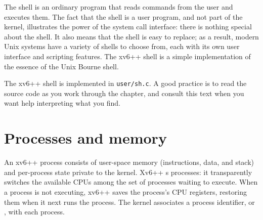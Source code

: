 The shell is an ordinary program that reads commands from the user
and executes them.
The fact that the shell is a user program, and not part of the kernel,
illustrates the power of the system call interface: there is nothing
special about the shell.
It also means that the shell is easy to replace; as a result,
modern Unix systems have a variety of
shells to choose from, each with its own user interface
and scripting features.
The xv6++ shell is a simple implementation of the essence of
the Unix Bourne shell.

The xv6++ shell is implemented in \texttt{user/sh.c}.
A good practice is to read the source code as you work through the chapter,
and consult this text when you want help interpreting what you find.

\section{Processes and memory}

An xv6++ process consists of user-space memory (instructions, data, and stack)
and per-process state private to the kernel.
Xv6++
s
processes: it transparently switches the available CPUs
among the set of processes waiting to execute.
When a process is not executing, xv6++ saves the process's CPU registers,
restoring them when it next runs the process.
The kernel associates a process identifier, or
,
with each process.

